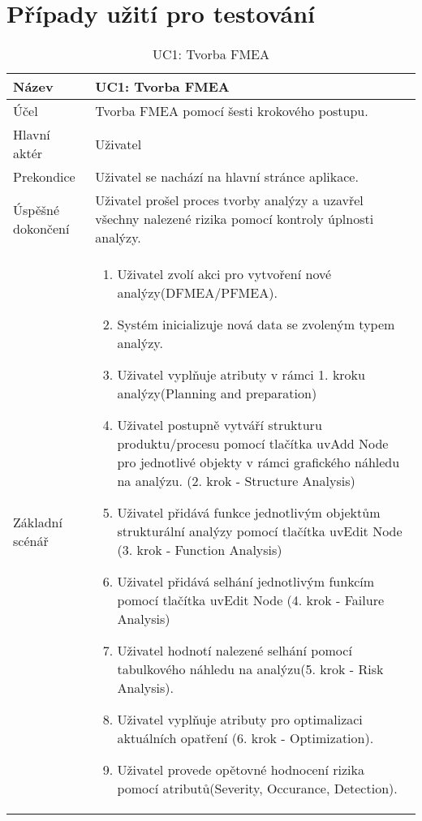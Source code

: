 \chapter{Případy užití pro testování}
\label{sec:UC}
\newpage

\begin{longtable}{p{4cm} | p{12cm} } 
     \caption{UC1: Tvorba FMEA}
        \label{tab:uc1}
\\
Název & UC1: Tvorba FMEA \\ \hline
Účel &   Tvorba FMEA pomocí šesti krokového postupu. \\\hline
Hlavní aktér  & Uživatel  \\ \hline
Prekondice & Uživatel se nachází na hlavní stránce aplikace. \\ \hline
Úspěšné dokončení & Uživatel prošel proces tvorby analýzy a uzavřel všechny nalezené rizika pomocí kontroly úplnosti analýzy. \\ \hline

        Základní scénář &  \begin{enumerate}
     \item Uživatel zvolí akci pro vytvoření nové analýzy(DFMEA/PFMEA).
     \item Systém inicializuje nová data se zvoleným typem analýzy.
     \item Uživatel vyplňuje atributy v rámci 1. kroku analýzy(Planning and preparation)
     \item Uživatel postupně vytváří strukturu produktu/procesu pomocí tlačítka uv{Add Node} pro jednotlivé objekty v rámci grafického náhledu na analýzu. (2. krok - Structure Analysis)
     \item Uživatel přidává funkce jednotlivým objektům strukturální analýzy pomocí tlačítka uv{Edit Node} (3. krok - Function Analysis)
     \item Uživatel přidává selhání jednotlivým funkcím pomocí tlačítka uv{Edit Node} (4. krok - Failure Analysis)
     \item Uživatel hodnotí nalezené selhání pomocí tabulkového náhledu na analýzu(5. krok - Risk Analysis). 
     \item Uživatel vyplňuje atributy pro optimalizaci aktuálních opatření \break (6. krok - Optimization). 
     \item Uživatel provede opětovné hodnocení rizika pomocí atributů(Severity, Occurance, Detection). 
     
\end{enumerate}\\ \hline


\end{longtable}
